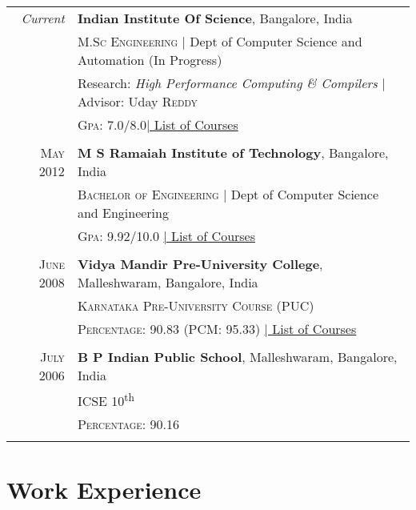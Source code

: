 \documentclass[a4paper,10pt]{article} %
\begin{document}
\begin{tabular}{rl}	
\emph{Current} & \textbf{Indian Institute Of Science}, Bangalore, India\\
& \textsc{M.Sc Engineering} | Dept of Computer Science and Automation (In Progress)\\
& Research: \small\emph{High Performance Computing \& Compilers} | Advisor: Uday \textsc{Reddy}\\
&\normalsize \textsc{Gpa}: 7.0/8.0\hyperlink{iisc}{\hfill | \footnotesize List of Courses}\\
&\\


\textsc{May} 2012 & \textbf{M S Ramaiah Institute of Technology}, Bangalore, India\\
& \textsc{Bachelor of Engineering} | Dept of Computer Science and Engineering \\
&\normalsize \textsc{Gpa}: 9.92/10.0 \hyperlink{msrit}{\hfill| \footnotesize List of Courses}\\
&\\


\textsc{June} 2008 & \textbf{Vidya Mandir Pre-University College}, Malleshwaram, Bangalore, India\\
& \textsc{Karnataka Pre-University Course (PUC)} \\
&\normalsize \textsc{Percentage}: 90.83 (PCM: 95.33) \hyperlink{hs}{\hfill| \footnotesize List of Courses}\\
&\\


\textsc{July} 2006 & \textbf{B P Indian Public School}, Malleshwaram, Bangalore, India\\
& \textsc{ICSE 10}\textsuperscript{th} \\
&\normalsize \textsc{Percentage}: 90.16 \\
&\\
\end{tabular}


\section{Work Experience}
\end{document}
